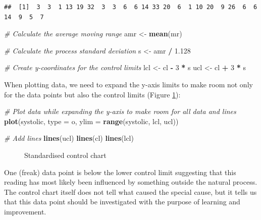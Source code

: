 \documentclass[
]{book}
\makeatletter
\newenvironment{Shaded}{\begin{snugshade}}{\end{snugshade}}
\newcommand{\AttributeTok}[1]{\textcolor[rgb]{0.13,0.29,0.53}{#1}}
\newcommand{\CommentTok}[1]{\textcolor[rgb]{0.56,0.35,0.01}{\textit{#1}}}
\newcommand{\DecValTok}[1]{\textcolor[rgb]{0.00,0.00,0.81}{#1}}
\newcommand{\FloatTok}[1]{\textcolor[rgb]{0.00,0.00,0.81}{#1}}
\newcommand{\FunctionTok}[1]{\textcolor[rgb]{0.13,0.29,0.53}{\textbf{#1}}}
\newcommand{\NormalTok}[1]{#1}
\newcommand{\OtherTok}[1]{\textcolor[rgb]{0.56,0.35,0.01}{#1}}
\newcommand{\SpecialCharTok}[1]{\textcolor[rgb]{0.81,0.36,0.00}{\textbf{#1}}}
\newcommand{\StringTok}[1]{\textcolor[rgb]{0.31,0.60,0.02}{#1}}
\newcommand*\pandocbounded[1]{%
  \sbox\pandoc@box{#1}%
  \Gscale@div\@tempa{\textheight}{\dimexpr\ht\pandoc@box+\dp\pandoc@box\relax}%
  \Gscale@div\@tempb{\linewidth}{\wd\pandoc@box}%
  \ifdim\@tempb\p@<\@tempa\p@\let\@tempa\@tempb\fi%
  \ifdim\@tempa\p@<\p@\scalebox{\@tempa}{\usebox\pandoc@box}%
  \else\usebox{\pandoc@box}%
  \fi%
}
\makeatother
\begin{document}
\begin{verbatim}
##  [1]  3  3  1 13 19 32  3  3  6  6 14 33 20  6  1 10 20  9 26  6  6 14  9  5  7
\end{verbatim}

\begin{Shaded}
\begin{Highlighting}[]
\CommentTok{\# Calculate the average moving range}
\NormalTok{amr }\OtherTok{\textless{}{-}} \FunctionTok{mean}\NormalTok{(mr)}

\CommentTok{\# Calculate the process standard deviation}
\NormalTok{s }\OtherTok{\textless{}{-}}\NormalTok{ amr }\SpecialCharTok{/} \FloatTok{1.128}

\CommentTok{\# Create y{-}coordinates for the control limits}
\NormalTok{lcl }\OtherTok{\textless{}{-}}\NormalTok{ cl }\SpecialCharTok{{-}} \DecValTok{3} \SpecialCharTok{*}\NormalTok{ s}
\NormalTok{ucl }\OtherTok{\textless{}{-}}\NormalTok{ cl }\SpecialCharTok{+} \DecValTok{3} \SpecialCharTok{*}\NormalTok{ s}
\end{Highlighting}
\end{Shaded}

When plotting data, we need to expand the y-axis limits to make room not only for the data points but also the control limits (Figure \ref{fig:first-chart-ctrl1}):

\begin{Shaded}
\begin{Highlighting}[]
\CommentTok{\# Plot data while expanding the y{-}axis to make room for all data and lines}
\FunctionTok{plot}\NormalTok{(systolic, }\AttributeTok{type =} \StringTok{\textquotesingle{}o\textquotesingle{}}\NormalTok{, }\AttributeTok{ylim =} \FunctionTok{range}\NormalTok{(systolic, lcl, ucl))}

\CommentTok{\# Add lines}
\FunctionTok{lines}\NormalTok{(ucl)}
\FunctionTok{lines}\NormalTok{(cl)}
\FunctionTok{lines}\NormalTok{(lcl)}
\end{Highlighting}
\end{Shaded}

\begin{figure}
\centering
\pandocbounded{}
\caption{\label{fig:first-chart-ctrl1}Standardised control chart}
\end{figure}

One (freak) data point is below the lower control limit suggesting that this reading has most likely been influenced by something outside the natural process. The control chart itself does not tell what caused the special cause, but it tells us that this data point should be investigated with the purpose of learning and improvement.
\end{document}
